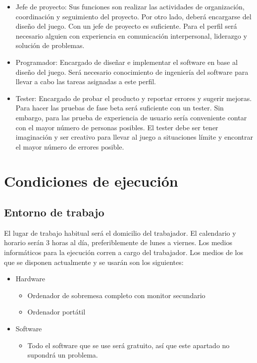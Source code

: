 \begin{itemize}
	\item Jefe de proyecto:
	Sus funciones son realizar las actividades de organización, coordinación y seguimiento del proyecto. Por otro lado, deberá encargarse del diseño del juego. Con un jefe de proyecto es suficiente. Para el perfil será necesario alguien con experiencia en comunicación interpersonal, liderazgo y solución de problemas.
	\item Programador:
	Encargado de diseñar e implementar el software en base al diseño del 	juego. Será necesario conocimiento de ingeniería del software para llevar a cabo las tareas asignadas a este perfil.
	\item Tester:
	Encargado de probar el producto y reportar errores y sugerir mejoras. 	Para hacer las 	pruebas de fase beta será suficiente con un tester. 	Sin embargo, para las prueba de 	experiencia de usuario sería 	conveniente contar con el mayor número de personas 	posibles. El tester debe ser tener imaginación y ser creativo para llevar al juego a situaciones límite y encontrar el mayor número de errores posible.
\end{itemize}

\chapter{Condiciones de ejecución}

\section{Entorno de trabajo}

El lugar de trabajo habitual será el domicilio del trabajador.
El calendario y horario serán 3 horas al día, preferiblemente de lunes a viernes.
Los medios informáticos para la ejecución corren a cargo del trabajador. Los medios de los que se disponen actualmente y se usarán son los siguientes: 

\begin{itemize}
	\item Hardware
	\begin{itemize}
		\item Ordenador de sobremesa completo con monitor secundario
		\item Ordenador portátil
	\end{itemize}
	\item Software
	\begin{itemize}
		\item Todo el software que se use será gratuito, así que este apartado no supondrá un problema.
	\end{itemize}
\end{itemize}


